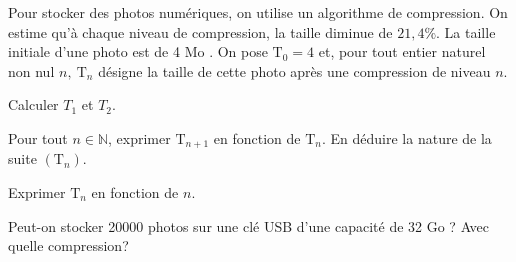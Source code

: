\documentclass[11pt,a4paper]{article}  %
\begin{document}
Pour stocker des photos numériques, on utilise un algorithme de compression. On estime qu'à chaque niveau de compression, la taille diminue de $21,4 \%$.
La taille initiale d'une photo est de 4 Mo . On pose $\mathrm{T}_0=4$ et, pour tout entier naturel non nul $n, \mathrm{~T}_n$ désigne la taille de cette photo après une compression de niveau $n$.
\begin{enumMet}
	\item Calculer $T_1$ et $T_2$.
	\item Pour tout $n \in \mathbb{N}$, exprimer $\mathrm{T}_{n+1}$ en fonction de $\mathrm{T}_n$. En déduire la nature de la suite $\left(\mathrm{T}_n\right)$.
	\item Exprimer $\mathrm{T}_n$ en fonction de $n$.
	\item Peut-on stocker 20000 photos sur une clé USB d'une capacité de 32 Go ? Avec quelle compression?
\end{enumMet}
\end{document}
